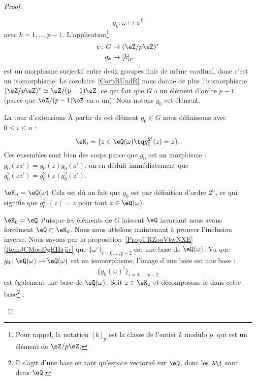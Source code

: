 \begin{proof}
\begin{subproof}
\begin{subproof}
			\begin{equation}
				g_k\colon \omega\mapsto \phi^k
			\end{equation}
			avec \( k=1,\ldots, p-1\). L'application\footnote{Pour rappel, la notation \( [k]_p\) est la classe de l'entier \( k\) modulo \( p\), qui est un élément de \( \eZ/p\eZ\).}
			\begin{equation}
				\begin{aligned}
					\psi\colon G & \to (\eZ/p\eZ)^* \\
					g_k          & \mapsto [k]_p .
				\end{aligned}
			\end{equation}
			est un morphisme surjectif entre deux groupes finis de même cardinal, donc c'est un isomorphisme. Le corolaire~\ref{CorpRUndR} nous donne de plus l'isomorphisme \( (\eZ/p\eZ)^*\simeq \eZ/(p-1)\eZ\), ce qui fait que \( G\) a un élément d'ordre \( p-1\) (parce que \( \eZ/(p-1)\eZ\) en a un). Nous notons \( g_0\) cet élément.
			\item[La tour d'extensions]
			À partir de cet élément \( g_0\in G\) nous définissons avec \( 0\leq i\leq n\) :
			\begin{equation}
				\eK_i=\{ z\in \eQ(\omega)\tq g_0^{2^i}(z)=z \}.
			\end{equation}
			Ces ensembles sont bien des corps parce que \( g_0\) est un morphisme : \( g_0(zz')=g_0(z)g_0(z')\); on en déduit immédiatement que \( g_0^2(zz')=g_0^2(z)g_0^2(z')\).
			\item[\( \eK_n=\eQ(\omega)\)]
			Cela est dû au fait que \( g_0\) est par définition d'ordre \( 2^n\), ce qui signifie que \( g_0^{2^n}(z)=z\) pour tout \( z\in \eQ(\omega)\).
			\item[\( \eK_0=\eQ\)]
			Puisque les éléments de \( G\) laissent \( \eQ\) invariant nous avons forcément \( \eQ\subset \eK_0\). Nous nous attelons maintenant à prouver l'inclusion inverse. Nous savons par la proposition~\ref{PropURZooVtwNXE}\ref{ItemJCMooDgEHajiv} que \( \{ \omega^i \}_{i=0,\ldots, p-2}\) est une base de \( \eQ(\omega)\). Vu que \( g_0\colon \eQ(\omega)\to \eQ(\omega)\) est un isomorphisme, l'image d'une base est une base :
			\begin{equation}
				\{ g_0(\omega)^i \}_{i=0,\ldots, p-2}
			\end{equation}
			est également une base de \( \eQ(\omega)\). Soit \( z\in \eK_0\) et décomposons-le dans cette base\footnote{Il s'agit d'une base en tant qu'espace vectoriel sur \( \eQ\), donc les \( \lambda\i\) sont dans \( \eQ\).} :

\end{subproof}
\end{subproof}
\end{proof}
